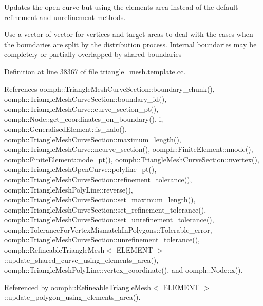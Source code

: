 Updates the open curve but using the elements area instead of the default refinement and unrefinement methods. 

Use a vector of vector for vertices and target areas to deal with the cases when the boundaries are split by the distribution process. Internal boundaries may be completely or partially overlapped by shared boundaries 

Definition at line 38367 of file triangle\+\_\+mesh.\+template.\+cc.



References oomph\+::\+Triangle\+Mesh\+Curve\+Section\+::boundary\+\_\+chunk(), oomph\+::\+Triangle\+Mesh\+Curve\+Section\+::boundary\+\_\+id(), oomph\+::\+Triangle\+Mesh\+Curve\+::curve\+\_\+section\+\_\+pt(), oomph\+::\+Node\+::get\+\_\+coordinates\+\_\+on\+\_\+boundary(), i, oomph\+::\+Generalised\+Element\+::is\+\_\+halo(), oomph\+::\+Triangle\+Mesh\+Curve\+Section\+::maximum\+\_\+length(), oomph\+::\+Triangle\+Mesh\+Curve\+::ncurve\+\_\+section(), oomph\+::\+Finite\+Element\+::nnode(), oomph\+::\+Finite\+Element\+::node\+\_\+pt(), oomph\+::\+Triangle\+Mesh\+Curve\+Section\+::nvertex(), oomph\+::\+Triangle\+Mesh\+Open\+Curve\+::polyline\+\_\+pt(), oomph\+::\+Triangle\+Mesh\+Curve\+Section\+::refinement\+\_\+tolerance(), oomph\+::\+Triangle\+Mesh\+Poly\+Line\+::reverse(), oomph\+::\+Triangle\+Mesh\+Curve\+Section\+::set\+\_\+maximum\+\_\+length(), oomph\+::\+Triangle\+Mesh\+Curve\+Section\+::set\+\_\+refinement\+\_\+tolerance(), oomph\+::\+Triangle\+Mesh\+Curve\+Section\+::set\+\_\+unrefinement\+\_\+tolerance(), oomph\+::\+Tolerance\+For\+Vertex\+Mismatch\+In\+Polygons\+::\+Tolerable\+\_\+error, oomph\+::\+Triangle\+Mesh\+Curve\+Section\+::unrefinement\+\_\+tolerance(), oomph\+::\+Refineable\+Triangle\+Mesh$<$ E\+L\+E\+M\+E\+N\+T $>$\+::update\+\_\+shared\+\_\+curve\+\_\+using\+\_\+elements\+\_\+area(), oomph\+::\+Triangle\+Mesh\+Poly\+Line\+::vertex\+\_\+coordinate(), and oomph\+::\+Node\+::x().



Referenced by oomph\+::\+Refineable\+Triangle\+Mesh$<$ E\+L\+E\+M\+E\+N\+T $>$\+::update\+\_\+polygon\+\_\+using\+\_\+elements\+\_\+area().

\mbox{\label{classoomph_1_1RefineableTriangleMesh_ab8fb7db201e871f082afe3170ddb812f}} 
